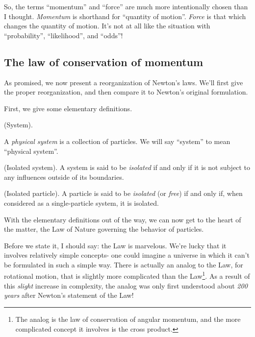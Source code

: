 \documentclass{article}
\begin{document}
So, the terms ``momentum'' and ``force'' are much more intentionally chosen than I thought. \textit{Momentum} is shorthand for ``quantity of motion''. \textit{Force} is that which changes the quantity of motion. It’s not at all like the situation with ``probability'', ``likelihood'', and ``odds''!

\newpage

\subsection*{The law of conservation of momentum}

As promised, we now present a reorganization of Newton's laws. We'll first give the proper reorganization, and then compare it to Newton's original formulation.

First, we give some elementary definitions.

\begin{defn}
	(System).
	
	A \textit{physical system} is a collection of particles. We will say ``system'' to mean ``physical system''.
\end{defn}

\begin{defn}
	(Isolated system). A system is said to be \textit{isolated} if and only if it is not subject to any influences outside of its boundaries\footnotemark.
\end{defn}


\begin{defn}
	(Isolated particle). A particle is said to be \textit{isolated} (or \textit{free}) if and only if, when considered as a single-particle system, it is isolated.
\end{defn}

With the elementary definitions out of the way, we can now get to the heart of the matter, the Law of Nature governing the behavior of particles.

Before we state it, I should say: the Law is marvelous. We're lucky that it involves relatively simple concepts- one could imagine a universe in which it can't be formulated in such a simple way. There is actually an analog to the Law, for rotational motion, that is slightly more complicated than the Law\footnote{The analog is the law of conservation of angular momentum, and the more complicated concept it involves is the cross product.}. As a result of this \textit{slight} increase in complexity, the analog was only first understood about \textit{200 years} after Newton's statement of the Law!
\end{document}
